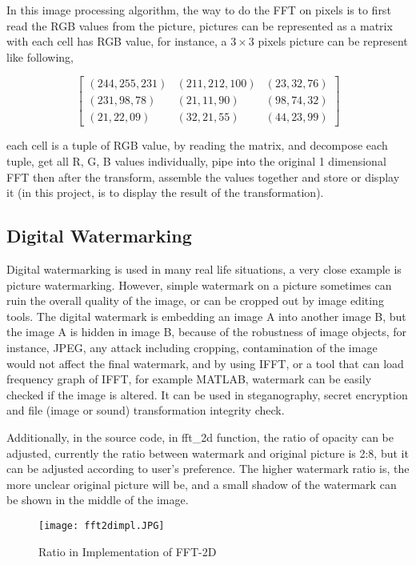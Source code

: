 \documentclass[12pt]{article}
\begin{document}
			In this image processing algorithm, the way to do the FFT on pixels is to first read the RGB values from the picture, pictures can be represented as a matrix with each cell has RGB value, for instance, a $3 \times 3$ pixels picture can be represent like following,
			
			\begin{center}
				\centering
				\[
				\begin{bmatrix}
					(244, 255, 231) & (211, 212, 100) & (23, 32, 76)\\
					(231, 98, 78) & (21, 11, 90) & (98, 74, 32)\\
					(21, 22, 09) & (32, 21, 55) & (44, 23, 99)
				\end{bmatrix}
				\]
			\end{center}
		
			each cell is a tuple of RGB value, by reading the matrix, and decompose each tuple, get all R, G, B values individually, pipe into the original 1 dimensional FFT then after the transform, assemble the values together and store or display it (in this project, is to display the result of the transformation).
		\subsection{Digital Watermarking}
			Digital watermarking is used in many real life situations, a very close example is picture watermarking. However, simple watermark on a picture sometimes can ruin the overall quality of the image, or can be cropped out by image editing tools. The digital watermark is embedding an image A into another image B, but the image A is hidden in image B, because of the robustness of image objects, for instance, JPEG, any attack including cropping, contamination of the image would not affect the final watermark, and by using IFFT, or a tool that can load frequency graph of IFFT, for example MATLAB, watermark can be easily checked if the image is altered. It can be used in steganography, secret encryption and file (image or sound) transformation integrity check.
			
			Additionally, in the source code, in fft\_2d function, the ratio of opacity can be adjusted, currently the ratio between watermark and original picture is 2:8, but it can be adjusted according to user's preference. The higher watermark ratio is, the more unclear original picture will be, and a small shadow of the watermark can be shown in the middle of the image.
			
			\begin{figure}[H]
				\caption{Ratio in Implementation of FFT-2D}
				\centering
				\texttt{[image: fft2dimpl.JPG]}\\[1cm]
			\end{figure}
		
\end{document}
